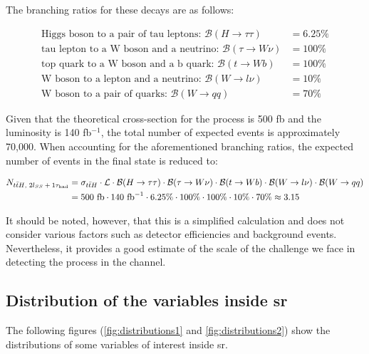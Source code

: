 The branching ratios for these decays are as follows:

\begin{align*}
    \text{Higgs boson to a pair of tau leptons: }\mathcal{B}(H \rightarrow \tau\tau)  & = 6.25\% \\
    \text{tau lepton to a W boson and a neutrino: }\mathcal{B}(\tau \rightarrow W\nu) & = 100\%  \\
    \text{top quark to a W boson and a b quark: }\mathcal{B}(t \rightarrow Wb)        & = 100\%  \\
    \text{W boson to a lepton and a neutrino: }\mathcal{B}(W \rightarrow l\nu)        & = 10\%   \\
    \text{W boson to a pair of quarks: }\mathcal{B}(W \rightarrow qq)                 & = 70\%
\end{align*}

Given that the theoretical cross-section for the \tth process is 500 fb and the luminosity is 140 fb$^{-1}$, the total
number of expected \tth events is approximately 70,000. When accounting for the aforementioned branching ratios, the
expected number of \tth events in the \lss final state is reduced to:

\begin{align*}
    N_{\text{\ensuremath{{t\bar{t}H}}, \ensuremath{2l_{SS}+1\tau_\text{had}}}} & = \sigma_{\text{\ensuremath{{t\bar{t}H}}}} \cdot \mathcal{L} \cdot \mathcal{B}(H \rightarrow \tau\tau) \cdot \mathcal{B}(\tau \rightarrow W\nu) \cdot \mathcal{B}(t \rightarrow Wb) \cdot \mathcal{B}(W \rightarrow l\nu) \cdot \mathcal{B}(W \rightarrow qq) \\
                          & = 500 \text{ fb} \cdot 140 \text{ fb}^{-1} \cdot 6.25\% \cdot 100\% \cdot 100\% \cdot 10\% \cdot 70\% \approx 3.15
\end{align*}

It should be noted, however, that this is a simplified calculation and does not consider various factors such as
detector efficiencies and background events. Nevertheless, it provides a good estimate of the scale of the challenge we
face in detecting the \tth process in the \lss channel.

\subsection{Distribution of the variables inside \gls{sr}}

The following figures (\autoref{fig:distributions1} and \autoref{fig:distributions2}) show the distributions of some variables
of interest inside \gls{sr}.

